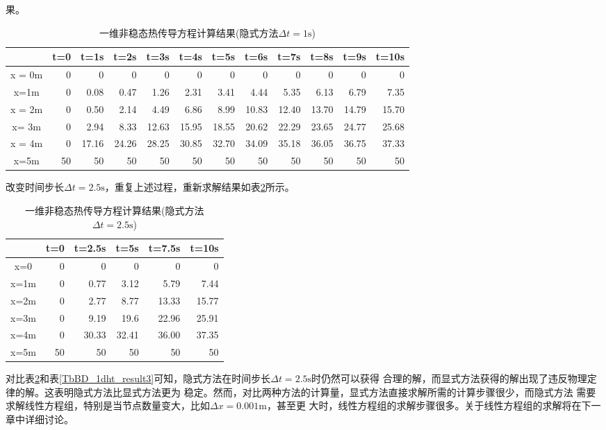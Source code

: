 果。
\begin{table}[h!]
  \begin{center}
    \caption{一维非稳态热传导方程计算结果(隐式方法$\Delta t=1\mathrm{s}$)}
  \label{TbBD_1dht_result4}
  \begin{tabular}{|c|r|r|r|r|r|r|r|r|r|r|r|}
    \hline
 & t=0 & t=1s & t=2s & t=3s & t=4s & t=5s & t=6s & t=7s & t=8s & t=9s & t=10s
 \\
  \hline
    x = 0m & 0& 0& 0& 0& 0& 0& 0& 0& 0& 0& 0
 \\
  \hline
    x=1m & 0 & 0.08 & 0.47 & 1.26 & 2.31 & 3.41 & 4.44 & 5.35 & 6.13 & 6.79 & 7.35
 \\
  \hline
    x = 2m & 0 & 0.50 & 2.14 & 4.49 & 6.86 & 8.99 & 10.83 & 12.40 & 13.70 & 14.79 & 15.70
 \\
  \hline
    x= 3m & 0 &2.94 & 8.33 & 12.63 & 15.95 & 18.55 & 20.62 & 22.29 & 23.65 & 24.77 & 25.68
 \\
  \hline
    x = 4m & 0 & 17.16 & 24.26 & 28.25 & 30.85 & 32.70 & 34.09 & 35.18 & 36.05 &
    36.75 & 37.33
 \\
  \hline
    x=5m &   50 & 50 & 50 &50 &50 &50 &50 &50 &50 &50 & 50
\\
    \hline
  \end{tabular}
  \end{center}
\end{table}

改变时间步长$\Delta t=2.5\mathrm{s}$，重复上述过程，重新求解结果如表\ref{TbBD_1dht_result5}所示。
\begin{table}[h!]
  \begin{center}
    \caption{一维非稳态热传导方程计算结果(隐式方法$\Delta t=2.5\mathrm{s}$)}
  \label{TbBD_1dht_result5}
  \begin{tabular}{|c|r|r|r|r|r|}
    \hline
 & t=0 & t=2.5s & t=5s & t=7.5s & t=10s
 \\
  \hline
x=0 & 0 & 0 & 0 & 0 & 0
\\
\hline
x=1m & 0 & 0.77  & 3.12  & 5.79  & 7.44
\\
\hline
x=2m & 0 & 2.77  & 8.77  & 13.33 & 15.77
\\
\hline
x=3m & 0 & 9.19  & 19.6 & 22.96  & 25.91
\\
\hline
x=4m & 0 & 30.33  & 32.41  & 36.00  & 37.35
\\
\hline
x=5m & 50 & 50 & 50 & 50 & 50 
\\
    \hline
  \end{tabular}
  \end{center}
\end{table}
对比表\ref{TbBD_1dht_result5}和表\ref{TbBD_1dht_result3}可知，隐式方法在时间步长$\Delta t=2.5\mathrm{s}$时仍然可以获得
合理的解，而显式方法获得的解出现了违反物理定律的解。这表明隐式方法比显式方法更为
稳定。然而，对比两种方法的计算量，显式方法直接求解所需的计算步骤很少，而隐式方法
需要求解线性方程组，特别是当节点数量变大，比如$\Delta x=0.001\mathrm{m}$，甚至更
大时，线性方程组的求解步骤很多。关于线性方程组的求解将在下一章中详细讨论。



